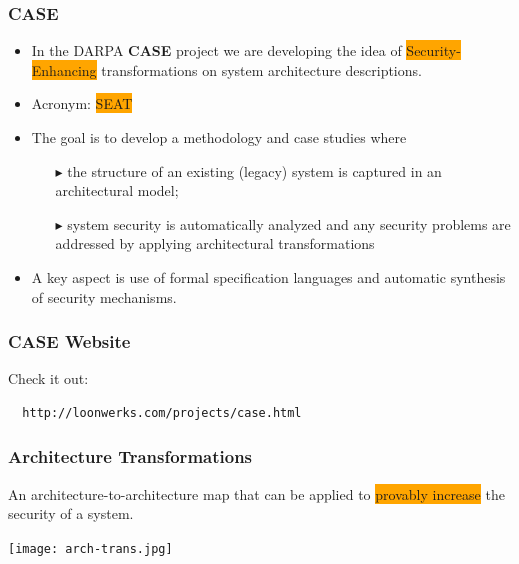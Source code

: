 \documentclass{beamer}
\newcommand{\kemph}[1]{\colorbox{orange}{#1}}
\begin{document}
\begin{frame}\frametitle{CASE}
\begin{itemize}

\item In the DARPA \textbf{CASE} project we are developing the idea of
  \kemph{Security-Enhancing} transformations on system architecture
  descriptions.

\item Acronym: \colorbox{orange}{SEAT}

\item The goal is to develop a methodology and case studies where
  \begin{itemize}
  \item [$\blacktriangleright$]
       the structure of an existing (legacy) system is captured in an architectural model;

 \item [$\blacktriangleright$] system security is automatically analyzed and any security
   problems are addressed by applying architectural transformations
 \end{itemize}

\item A key aspect is use of formal specification languages and
  automatic synthesis of security mechanisms.

\end{itemize}

\end{frame}

\begin{frame}[fragile]\frametitle{CASE Website}

Check it out:

\begin{verbatim}
  http://loonwerks.com/projects/case.html
\end{verbatim}

\end{frame}


\begin{frame}\frametitle{Architecture Transformations}

An architecture-to-architecture map that can be applied to
\kemph{provably increase} the security of a system.

\vspace*{4mm}

\texttt{[image: arch-trans.jpg]}
\end{frame}
\end{document}

